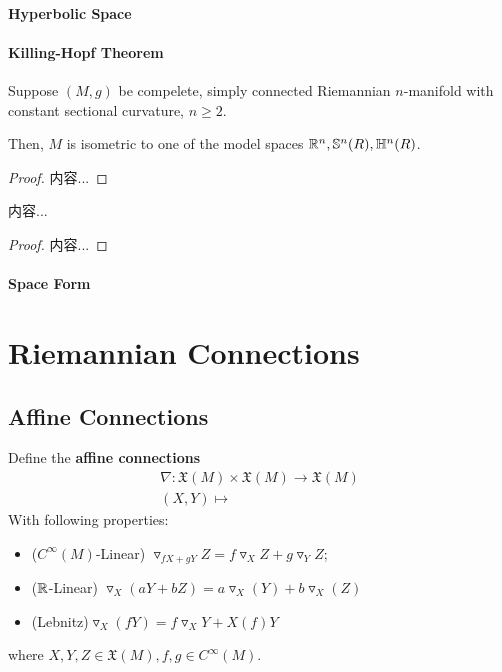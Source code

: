 \documentclass[Total.tex]{subfiles}
\begin{document}
				\subsubsection{Hyperbolic Space}
				\subsubsection{Killing-Hopf Theorem}
					\begin{theorem}
						Suppose $(M,g)$ be compelete, simply connected Riemannian $n$-manifold with constant sectional curvature, $n\geq 2$.
						
						Then, $M$ is isometric to one of the model spaces $\mathbb{R}^n,\mathbb{S}^n(R),\mathbb{H}^n(R)$.
					\end{theorem}
					\begin{proof}
						内容...
					\end{proof}
					
					\begin{corollary}
						内容...
					\end{corollary}
					\begin{proof}
						内容...
					\end{proof}
				\subsubsection{Space Form}
	\chapter{Riemannian Connections}
		\section{Affine Connections}
			\begin{Def}
				Define the \textbf{affine connections}
				\begin{gather*}
					\nabla:\mathfrak{X}(M)\times \mathfrak{X}(M)\rightarrow \mathfrak{X}(M)\\
					(X,Y)\mapsto 
				\end{gather*}
				With following properties:
				\begin{itemize}
					\item ($C^\infty(M)$-Linear) $\triangledown_{fX+gY}Z=f\triangledown_X Z+g\triangledown_{Y}Z$;
					\item($\mathbb{R}$-Linear) $\triangledown_{X}(aY+bZ)=a\triangledown_X(Y)+b\triangledown_X(Z)$
					\item (Lebnitz)$\triangledown_{X}(fY)=f\triangledown_X Y+X(f)Y$
				\end{itemize}
				where $X,Y,Z\in \mathfrak{X}(M),f,g\in C^\infty(M)$.
			\end{Def}
			
\end{document}
